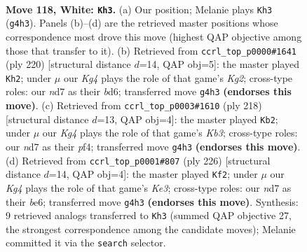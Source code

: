 \documentclass[11pt]{article}
\begin{document}
\clearpage

\begin{figure}[p]\centering
\begin{subfigure}{0.46\textwidth}\centering
\resizebox{\linewidth}{!}{%
\newchessgame
\chessboard[
  setfen={6k1/3n4/8/5P2/p5KP/P7/5B2/8 w - - 3 118},
  showmover=false,
  pgfstyle=straightmove, color=movearrow, markmove={g4-h3}
]}
\caption{}
\end{subfigure}\hfill
\begin{subfigure}{0.46\textwidth}\centering
\resizebox{\linewidth}{!}{%
\newchessgame
\chessboard[
  setfen={2B5/6k1/3b4/6p1/8/5PPP/6K1/8 w - - 39 111},
  showmover=false,
  pgfstyle=straightmove, color=movearrow, markmove={g2-h2}
]}
\caption{}
\end{subfigure}
\\[4pt]
\begin{subfigure}{0.46\textwidth}\centering
\resizebox{\linewidth}{!}{%
\newchessgame
\chessboard[
  setfen={8/8/1k1p4/3P4/1P2Bp1b/1KP5/8/8 w - - 25 110},
  showmover=false,
  pgfstyle=straightmove, color=movearrow, markmove={b3-b2}
]}
\caption{}
\end{subfigure}\hfill
\begin{subfigure}{0.46\textwidth}\centering
\resizebox{\linewidth}{!}{%
\newchessgame
\chessboard[
  setfen={8/8/4b2k/8/4P3/2B1KP2/8/8 w - - 51 114},
  showmover=false,
  pgfstyle=straightmove, color=movearrow, markmove={e3-f2}
]}
\caption{}
\end{subfigure}
\caption{\textbf{Move 118, White: \texttt{Kh3}.} (a) Our position; Melanie plays \texttt{Kh3} (\texttt{g4h3}). Panels (b)--(d) are the retrieved master positions whose correspondence most drove this move (highest QAP objective among those that transfer to it). (b) Retrieved from \texttt{ccrl\_top\_p0000\#1641} (ply 220) [structural distance $d$=14, QAP obj=5]: the master played \texttt{Kh2}; under $\mu$ our \emph{Kg4} plays the role of that game's \emph{Kg2}; cross-type roles: our \emph{n}d7 as their \emph{b}d6; transferred move \texttt{g4h3} \textbf{(endorses this move)}. (c) Retrieved from \texttt{ccrl\_top\_p0003\#1610} (ply 218) [structural distance $d$=13, QAP obj=4]: the master played \texttt{Kb2}; under $\mu$ our \emph{Kg4} plays the role of that game's \emph{Kb3}; cross-type roles: our \emph{n}d7 as their \emph{p}f4; transferred move \texttt{g4h3} \textbf{(endorses this move)}. (d) Retrieved from \texttt{ccrl\_top\_p0001\#807} (ply 226) [structural distance $d$=14, QAP obj=4]: the master played \texttt{Kf2}; under $\mu$ our \emph{Kg4} plays the role of that game's \emph{Ke3}; cross-type roles: our \emph{n}d7 as their \emph{b}e6; transferred move \texttt{g4h3} \textbf{(endorses this move)}. Synthesis: 9 retrieved analogs transferred to \texttt{Kh3} (summed QAP objective 27, the strongest correspondence among the candidate moves); Melanie committed it via the \texttt{search} selector.}
\label{fig:thought-m234}
\end{figure}
\end{document}

